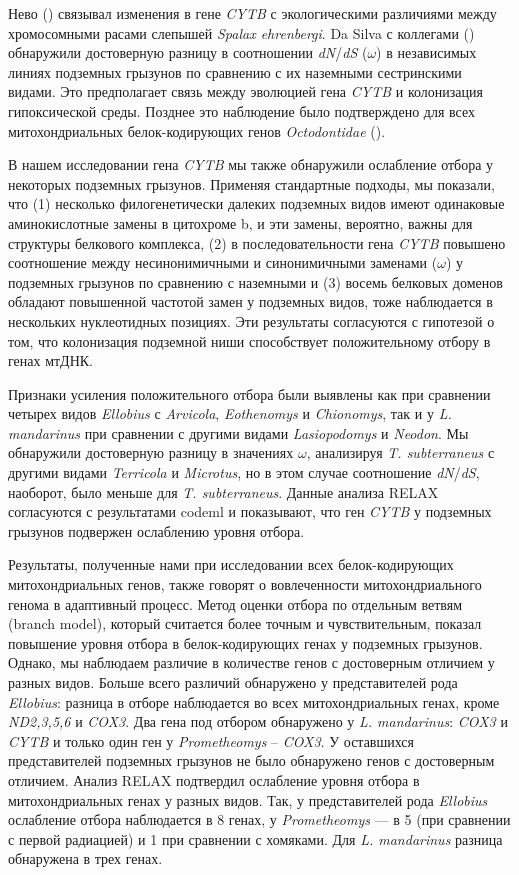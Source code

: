 Нево (\cite{Nevo1999}) связывал изменения в гене \textit{CYTB} с экологическими различиями между хромосомными расами слепышей \textit{Spalax ehrenbergi}. Da Silva с коллегами (\cite{DaSilva2009}) обнаружили достоверную разницу в соотношении \textit{dN}/\textit{dS} ($\omega$) в независимых линиях подземных грызунов по сравнению с их наземными сестринскими видами. Это предполагает связь между эволюцией гена \textit{CYTB} и колонизация гипоксической среды. Позднее это наблюдение было подтверждено для всех митохондриальных белок-кодирующих генов \textit{Octodontidae} (\cite{Tomasco2011}).

В нашем исследовании гена \textit{CYTB} мы также обнаружили ослабление отбора у некоторых подземных грызунов. Применяя стандартные подходы, мы показали, что (1) несколько филогенетически далеких подземных видов имеют одинаковые аминокислотные замены в цитохроме b, и эти замены, вероятно, важны для структуры белкового комплекса, (2) в последовательности гена \textit{CYTB} повышено соотношение между несинонимичными и синонимичными заменами ($\omega$) у подземных грызунов по сравнению с наземными и (3) восемь белковых доменов обладают повышенной частотой замен у подземных видов, тоже наблюдается в нескольких нуклеотидных позициях. Эти результаты согласуются с гипотезой о том, что колонизация подземной ниши способствует положительному отбору в генах мтДНК.

Признаки усиления положительного отбора были выявлены как при сравнении четырех видов \textit{Ellobius} с \textit{Arvicola}, \textit{Eothenomys} и \textit{Chionomys}, так и у \textit{L. mandarinus} при сравнении с другими видами \textit{Lasiopodomys} и \textit{Neodon}. Мы обнаружили достоверную разницу в значениях $\omega$, анализируя \textit{T. subterraneus} с другими видами \textit{Terricola} и \textit{Microtus}, но в этом случае соотношение \textit{dN}/\textit{dS}, наоборот, было меньше для \textit{T. subterraneus}. Данные анализа RELAX согласуются с результатами codeml и показывают, что ген \textit{CYTB} у подземных грызунов подвержен ослаблению уровня отбора.


Результаты, полученные нами при исследовании всех белок-кодирующих митохондриальных генов, также говорят о вовлеченности митохондриального генома в адаптивный процесс. Метод оценки отбора по отдельным ветвям (branch model), который считается более точным и чувствительным, показал повышение уровня отбора в белок-кодирующих генах у подземных грызунов. Однако, мы наблюдаем различие в количестве генов с достоверным отличием у разных видов. Больше всего различий обнаружено у представителей рода \textit{Ellobius}: разница в отборе наблюдается во всех митохондриальных генах, кроме \textit{ND2,3,5,6} и \textit{COX3}. Два гена под отбором обнаружено у \textit{L. mandarinus}: \textit{COX3} и \textit{CYTB} и только один ген у \textit{Prometheomys} -- \textit{COX3}. У оставшихся представителей подземных грызунов не было обнаружено генов с достоверным отличием. Анализ RELAX подтвердил ослабление уровня отбора в митохондриальных генах у разных видов. Так, у представителей рода \textit{Ellobius} ослабление отбора наблюдается в 8 генах, у \textit{Prometheomys} --- в 5 (при сравнении с первой радиацией) и 1 при сравнении с хомяками. Для \textit{L. mandarinus} разница обнаружена в трех генах.  

